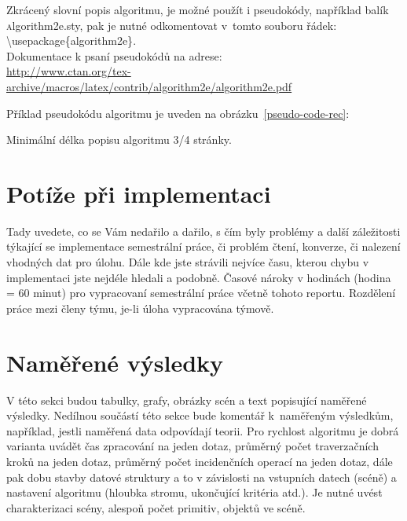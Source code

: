\documentclass[report,11pt]{elsarticle}
\begin{document}
Zkrácený slovní popis algoritmu, je možné použít i pseudokódy,
například balík {\textsc algorithm2e.sty}, pak je nutné odkomentovat
v~tomto souboru řádek:\\

{\textsc \textbackslash usepackage\{algorithm2e\}}.\\

Dokumentace k psaní pseudokódů na adrese:\\

\url{http://www.ctan.org/tex-archive/macros/latex/contrib/algorithm2e/algorithm2e.pdf}

Příklad pseudokódu algoritmu je uveden na obrázku~\ref{pseudo-code-rec}:



Minimální délka popisu algoritmu 3/4 stránky.

\section{\label{SEC:Pitfalls}Potíže při implementaci}

Tady uvedete, co se Vám nedařilo a dařilo, s čím byly problémy a další
záležitosti týkající se implementace semestrální práce, či problém
čtení, konverze, či nalezení vhodných dat pro úlohu. Dále kde jste
strávili nejvíce času, kterou chybu v implementaci jste nejdéle
hledali a podobně. Časové nároky v hodinách (hodina = 60 minut) pro
vypracovaní semestrální práce včetně tohoto reportu. Rozdělení práce
mezi členy týmu, je-li úloha vypracována týmově.

\section{\label{SEC:Results}Naměřené výsledky}

V této sekci budou tabulky, grafy, obrázky scén a text popisující
naměřené výsledky. Nedílnou součástí této sekce bude komentář
k~naměřeným výsledkům, například, jestli naměřená data odpovídají
teorii. Pro rychlost algoritmu je dobrá varianta uvádět čas zpracování
na jeden dotaz, průměrný počet traverzačních kroků na jeden dotaz,
průměrný počet incidenčních operací na jeden dotaz, dále pak dobu
stavby datové struktury a to v závislosti na vstupních datech (scéně)
a nastavení algoritmu (hloubka stromu, ukončující kritéria atd.). Je
nutné uvést charakterizaci scény, alespoň počet primitiv, objektů ve
scéně.
\end{document}
